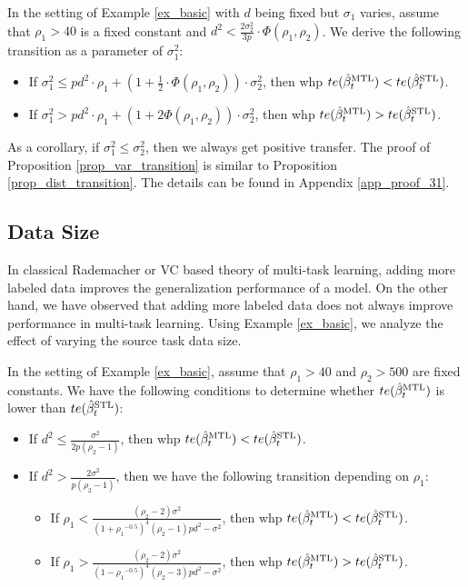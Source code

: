 \begin{proposition}\label{prop_var_transition}
	In the setting of Example \ref{ex_basic} with $d$ being fixed but $\sigma_1$ varies, assume that $\rho_1 > 40$ is a fixed constant and $d^2 < \frac {2\sigma_2^2} {3p} \cdot \Phi(\rho_1, \rho_2)$.
	We derive the following transition as a parameter of $\sigma_1^2$:
	\begin{itemize}
		\item If $\sigma_1^2 \le p d^2 \cdot \rho_1 +\left(1+ \frac12 \cdot \Phi(\rho_1, \rho_2)\right)\cdot\sigma_2^2$, then whp $te(\hat{\beta}_t^{\text{MTL}}) < te(\hat{\beta}_t^{\text{STL}})$.
		\item If $\sigma_1^2 > p d^2 \cdot \rho_1 +\left(1+ 2\Phi(\rho_1, \rho_2)\right) \cdot \sigma_2^2$, then whp $te(\hat{\beta}_t^{\text{MTL}}) > te(\hat{\beta}_t^{\text{STL}})$.
	\end{itemize}
\end{proposition}
As a corollary, if $\sigma_1^2 \le \sigma_2^2$, then we always get positive transfer.
The proof of Proposition \ref{prop_var_transition} is similar to Proposition \ref{prop_dist_transition}.
The details can be found in Appendix \ref{app_proof_31}.


\subsection{Data Size}\label{sec_data_size}

In classical Rademacher or VC based theory of multi-task learning, adding more labeled data improves the generalization performance of a model.
On the other hand, we have observed that adding more labeled data does not always improve performance in multi-task learning.
Using Example \ref{ex_basic}, we analyze the effect of varying the source task data size.

\begin{proposition}\label{prop_data_size}
	In the setting of Example \ref{ex_basic}, assume that $\rho_1 > 40$ and $\rho_2 > 500$ are fixed constants.
	We have the following conditions to determine whether $te(\hat{\beta}_t^{\text{MTL}})$ is lower than $te(\hat{\beta}_t^{\text{STL}})$:
	\begin{itemize}
\item If $d^2 \le \frac{\sigma^2}{2p(\rho_2-1)}$, then whp $te(\hat{\beta}_t^{\text{MTL}}) < te(\hat{\beta}_t^{\text{STL}})$.
		 
\item If $d^2 > \frac{2\sigma^2}{p (\rho_2 - 1)}$, then we have the following transition depending on $\rho_1$:
		\begin{itemize}
			\item If $\rho_1 < \frac{(\rho_2-2)\sigma^2}{(1 + {\rho_1}^{-0.5})^4(\rho_2 - 1) pd^2 - \sigma^2}$, then whp $te(\hat{\beta}_t^{\text{MTL}}) < te(\hat{\beta}_t^{\text{STL}})$.
			\item If $\rho_1 > \frac{(\rho_2-2) \sigma^2}{(1 - {\rho_1}^{-0.5})^4 (\rho_2 - 3) pd^2 - \sigma^2}$, then whp $te(\hat{\beta}_t^{\text{MTL}}) > te(\hat{\beta}_t^{\text{STL}})$.
		\end{itemize}
	\end{itemize}
\end{proposition}

